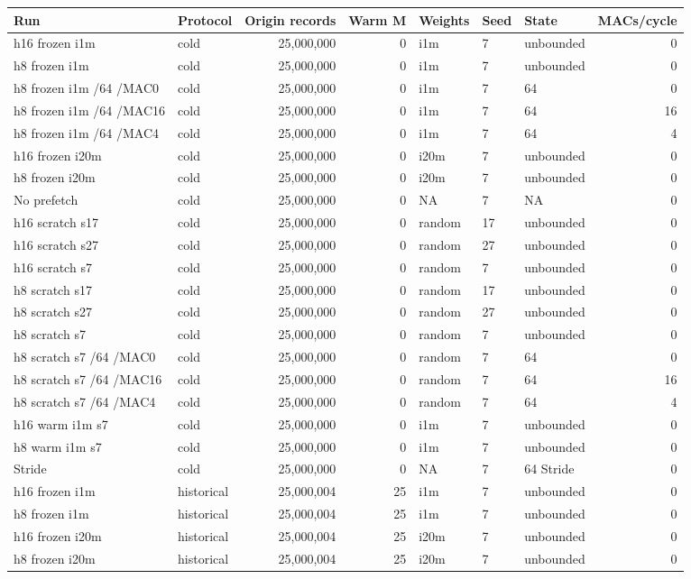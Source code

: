 \documentclass[10pt]{article}
\begin{document}
\begin{center}
\scriptsize
\begin{longtable}{llrrlllr}
\toprule
Run & Protocol & Origin records & Warm M & Weights & Seed & State & MACs/cycle \\
\midrule
\endhead
h16 frozen i1m & cold & 25,000,000 & 0 & i1m & 7 & unbounded & 0 \\
h8 frozen i1m & cold & 25,000,000 & 0 & i1m & 7 & unbounded & 0 \\
h8 frozen i1m /64 /MAC0 & cold & 25,000,000 & 0 & i1m & 7 & 64 & 0 \\
h8 frozen i1m /64 /MAC16 & cold & 25,000,000 & 0 & i1m & 7 & 64 & 16 \\
h8 frozen i1m /64 /MAC4 & cold & 25,000,000 & 0 & i1m & 7 & 64 & 4 \\
h16 frozen i20m & cold & 25,000,000 & 0 & i20m & 7 & unbounded & 0 \\
h8 frozen i20m & cold & 25,000,000 & 0 & i20m & 7 & unbounded & 0 \\
No prefetch & cold & 25,000,000 & 0 & NA & 7 & NA & 0 \\
h16 scratch s17 & cold & 25,000,000 & 0 & random & 17 & unbounded & 0 \\
h16 scratch s27 & cold & 25,000,000 & 0 & random & 27 & unbounded & 0 \\
h16 scratch s7 & cold & 25,000,000 & 0 & random & 7 & unbounded & 0 \\
h8 scratch s17 & cold & 25,000,000 & 0 & random & 17 & unbounded & 0 \\
h8 scratch s27 & cold & 25,000,000 & 0 & random & 27 & unbounded & 0 \\
h8 scratch s7 & cold & 25,000,000 & 0 & random & 7 & unbounded & 0 \\
h8 scratch s7 /64 /MAC0 & cold & 25,000,000 & 0 & random & 7 & 64 & 0 \\
h8 scratch s7 /64 /MAC16 & cold & 25,000,000 & 0 & random & 7 & 64 & 16 \\
h8 scratch s7 /64 /MAC4 & cold & 25,000,000 & 0 & random & 7 & 64 & 4 \\
h16 warm i1m s7 & cold & 25,000,000 & 0 & i1m & 7 & unbounded & 0 \\
h8 warm i1m s7 & cold & 25,000,000 & 0 & i1m & 7 & unbounded & 0 \\
Stride & cold & 25,000,000 & 0 & NA & 7 & 64 Stride & 0 \\
h16 frozen i1m & historical & 25,000,004 & 25 & i1m & 7 & unbounded & 0 \\
h8 frozen i1m & historical & 25,000,004 & 25 & i1m & 7 & unbounded & 0 \\
h16 frozen i20m & historical & 25,000,004 & 25 & i20m & 7 & unbounded & 0 \\
h8 frozen i20m & historical & 25,000,004 & 25 & i20m & 7 & unbounded & 0 \\
\bottomrule
\end{longtable}
\end{center}
\end{document}
